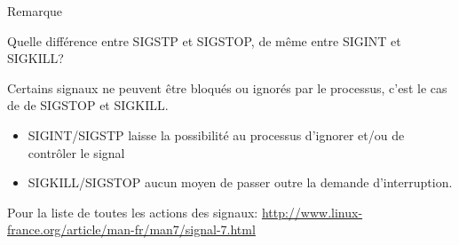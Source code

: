 \documentclass[9pt]{beamer}
\begin{document}
\begin{frame}{Remarque}
    
    \begingroup
    \begin{block}{Quelle différence entre SIGSTP et SIGSTOP, de même entre SIGINT et SIGKILL?}
    
    Certains signaux ne peuvent être bloqués ou ignorés par le processus, c'est le cas de de SIGSTOP et SIGKILL.
    \begin{itemize}
        \item  SIGINT/SIGSTP laisse la possibilité au processus d'ignorer et/ou de contrôler le signal
        \item SIGKILL/SIGSTOP aucun moyen de passer outre la demande d'interruption.
    \end{itemize}
    
    \end{block}
\endgroup


Pour la liste de toutes les actions des signaux:
\url{http://www.linux-france.org/article/man-fr/man7/signal-7.html}

\end{frame}
\end{document}

